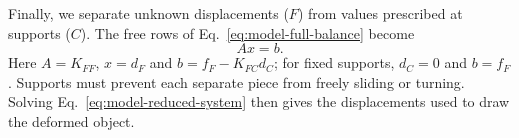 Finally, we separate unknown displacements ($F$) from values prescribed
at supports ($C$). The free rows of Eq.~\eqref{eq:model-full-balance} become
\begin{equation}
 Ax=b.
 \label{eq:model-reduced-system}
\end{equation}
Here $A=K_{FF}$, $x=d_F$ and $b=f_F-K_{FC}d_C$; for fixed supports,
$d_C=0$ and $b=f_F$. Supports must prevent each separate piece from
freely sliding or turning. Solving Eq.~\eqref{eq:model-reduced-system}
then gives the displacements used to draw the deformed object.
